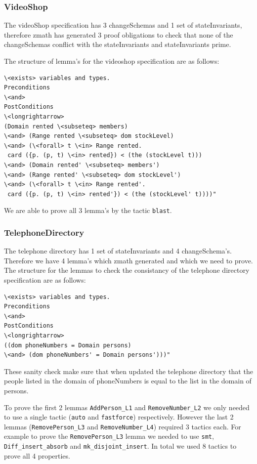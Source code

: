\subsubsection{VideoShop}

The videoShop specification has 3 changeSchemas and 1 set of stateInvariants, therefore \gls{zmath} has generated 3 proof obligations to check that none of the changeSchemas conflict with the stateInvariants and stateInvariants prime.

The structure of lemma's for the videoshop specification are as follows:

\begin{verbatim}
\<exists> variables and types.
Preconditions
\<and>
PostConditions
\<longrightarrow>
(Domain rented \<subseteq> members)
\<and> (Range rented \<subseteq> dom stockLevel)
\<and> (\<forall> t \<in> Range rented.
 card ({p. (p, t) \<in> rented}) < (the (stockLevel t)))
\<and> (Domain rented' \<subseteq> members')
\<and> (Range rented' \<subseteq> dom stockLevel')
\<and> (\<forall> t \<in> Range rented'.
 card ({p. (p, t) \<in> rented'}) < (the (stockLevel' t))))"
\end{verbatim}

We are able to prove all 3 lemma's by the tactic \verb|blast|. 

\subsubsection{TelephoneDirectory}

The telephone directory has 1 set of stateInvariants and 4 changeSchema's. Therefore we have 4 lemma's which \gls{zmath} generated and which we need to prove. The structure for the lemmas to check the consistancy of the telephone directory specification are as follows:

\begin{verbatim}
\<exists> variables and types.
Preconditions
\<and>
PostConditions
\<longrightarrow>
((dom phoneNumbers = Domain persons)
\<and> (dom phoneNumbers' = Domain persons')))"
\end{verbatim}

These sanity check make sure that when updated the telephone directory that the people listed in the domain of phoneNumbers is equal to the list in the domain of persons.

To prove the first 2 lemmas \verb|AddPerson_L1| and \verb|RemoveNumber_L2| we only needed to use a single tactic (\verb|auto| and \verb|fastforce|) respectively. However the last 2 lemmas (\verb|RemovePerson_L3| and \verb|RemoveNumber_L4|) required 3 tactics each. For example to prove the \verb|RemovePerson_L3| lemma we needed to use \verb|smt|, \verb| Diff_insert_absorb| and \verb|mk_disjoint_insert|. In total we used 8 tactics to prove all 4 properties.


